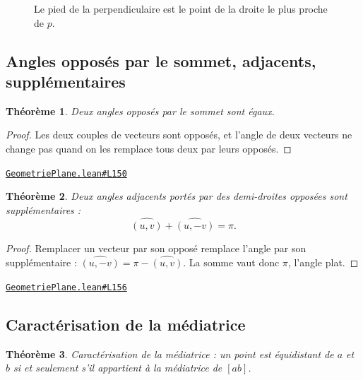\documentclass[11pt,a4paper]{article}
\theoremstyle{definition}
\theoremstyle{plain}
\newtheorem{theoreme}{Théorème}
\newcommand{\source}[2]{\par\smallskip\noindent\hfill{\footnotesize\href{#1}{\texttt{#2}}}\par\smallskip}
\begin{document}
\begin{figure}[h]
\centering

\caption{Le pied de la perpendiculaire est le point de la droite le plus proche de $p$.}
\end{figure}

\subsection{Angles opposés par le sommet, adjacents, supplémentaires}

\begin{theoreme}
Deux angles opposés par le sommet sont égaux.
\end{theoreme}

\begin{proof}
Les deux couples de vecteurs sont opposés, et l'angle de deux vecteurs ne change pas
quand on les remplace tous deux par leurs opposés.
\end{proof}
\source{https://github.com/Commutator-IO/learn-lean/blob/main/courses/01-college/02-geometrie-plane/GeometriePlane.lean\#L150}{GeometriePlane.lean\#L150}

\begin{theoreme}
Deux angles adjacents portés par des demi-droites opposées sont supplémentaires :
\[ \widehat{(u, v)} + \widehat{(u, -v)} = \pi . \]
\end{theoreme}

\begin{proof}
Remplacer un vecteur par son opposé remplace l'angle par son supplémentaire :
$\widehat{(u, -v)} = \pi - \widehat{(u, v)}$. La somme vaut donc $\pi$, l'angle plat.
\end{proof}
\source{https://github.com/Commutator-IO/learn-lean/blob/main/courses/01-college/02-geometrie-plane/GeometriePlane.lean\#L156}{GeometriePlane.lean\#L156}

\subsection{Caractérisation de la médiatrice}

\begin{theoreme}
Caractérisation de la médiatrice : un point est équidistant de $a$ et $b$ si et
seulement s'il appartient à la médiatrice de $[ab]$.
\end{theoreme}
\end{document}
